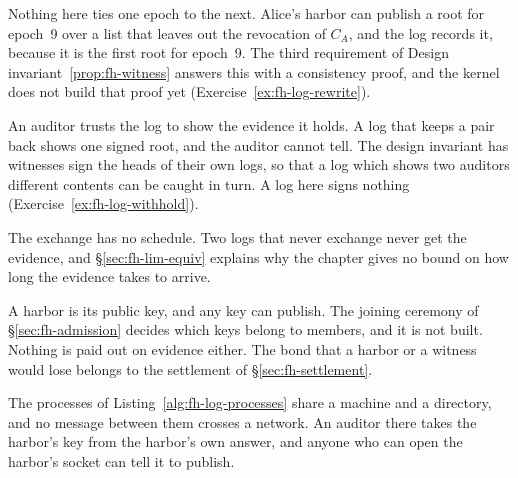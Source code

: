 \begin{pdboundary}
\setlength{\parskip}{4pt plus 1pt}
Nothing here ties one epoch to the next. Alice's harbor can publish a root
for epoch~9 over a list that leaves out the revocation of $C_A$, and the log
records it, because it is the first root for epoch~9. The third
requirement of Design invariant~\ref{prop:fh-witness} answers this with a
consistency proof, and the kernel does not build that proof yet
(Exercise~\ref{ex:fh-log-rewrite}).

An auditor trusts the log to show the evidence it holds. A log that keeps
a pair back shows one signed root, and the auditor cannot tell. The
design invariant has witnesses sign the heads of their own logs, so that
a log which shows two auditors different contents can be caught in turn.
A log here signs nothing (Exercise~\ref{ex:fh-log-withhold}).

The exchange has no schedule. Two logs that never exchange never get the
evidence, and \S\ref{sec:fh-lim-equiv} explains why the chapter gives no
bound on how long the evidence takes to arrive.

A harbor is its public key, and any key can publish. The joining ceremony
of \S\ref{sec:fh-admission} decides which keys belong to members, and it
is not built. Nothing is paid out on evidence either. The bond that a
harbor or a witness would lose belongs to the settlement of
\S\ref{sec:fh-settlement}.

The processes of Listing~\ref{alg:fh-log-processes} share a machine and
a directory, and no message between them crosses a network. An auditor
there takes the harbor's key from the harbor's own answer, and anyone who
can open the harbor's socket can tell it to publish.
\end{pdboundary}
